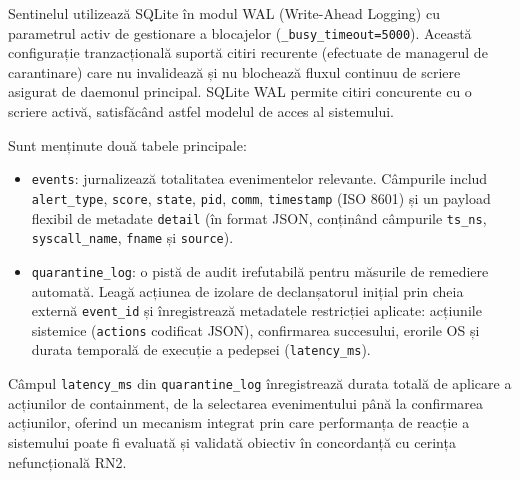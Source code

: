 \par Sentinelul utilizează SQLite în modul WAL (Write-Ahead Logging) cu parametrul activ de gestionare a blocajelor (\texttt{\_busy\_timeout=5000}). Această configurație tranzacțională suportă citiri recurente (efectuate de managerul de carantinare) care nu invalidează și nu blochează fluxul continuu de scriere asigurat de daemonul principal. SQLite WAL permite citiri concurente cu o scriere activă, satisfăcând astfel modelul de acces al sistemului.

\par Sunt menținute două tabele principale:

\begin{itemize}
    \item \texttt{events}: jurnalizează totalitatea evenimentelor relevante. Câmpurile includ \texttt{alert\_type}, \texttt{score}, \texttt{state}, \texttt{pid}, \texttt{comm}, \texttt{timestamp} (ISO 8601) și un payload flexibil de metadate \texttt{detail} (în format JSON, conținând câmpurile \texttt{ts\_ns}, \texttt{syscall\_name}, \texttt{fname} și \texttt{source}).
    \item \texttt{quarantine\_log}: o pistă de audit irefutabilă pentru măsurile de remediere automată. Leagă acțiunea de izolare de declanșatorul inițial prin cheia externă \texttt{event\_id} și înregistrează metadatele restricției aplicate: acțiunile sistemice (\texttt{actions} codificat JSON), confirmarea succesului, erorile OS și durata temporală de execuție a pedepsei (\texttt{latency\_ms}).
\end{itemize}
 
\par Câmpul \texttt{latency\_ms} din \texttt{quarantine\_log} înregistrează durata totală de aplicare a acțiunilor de containment, de la selectarea evenimentului până la confirmarea acțiunilor, oferind un mecanism integrat prin care performanța de reacție a sistemului poate fi evaluată și validată obiectiv în concordanță cu cerința nefuncțională RN2.